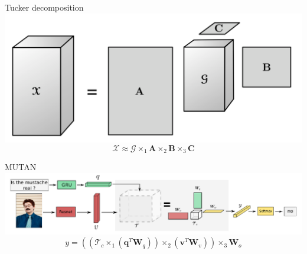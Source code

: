 \documentclass{beamer}
\begin{document}
{%
\begin{frame}{Tucker decomposition}
        \center{}
        \includegraphics[scale=0.28]{data/tucker_decomp}
        \begin{equation*}
                \mathcal{X} \approx \mathcal{G} \times_1 \mathbf{A} \times_2 \mathbf{B} \times_3 \mathbf{C}
        \end{equation*}
\end{frame}
}

{%
\begin{frame}{MUTAN}
        \center{}
        \hspace*{-1.0cm}
        \includegraphics[scale=0.31]{data/mutan}
        \begin{equation*}
                y = \left(\left(\mathcal{T}_c \times_1 \left(\mathbf{q}^T\mathbf{W}_q\right)\right)
                        \times_2 \left(\mathbf{v}^T\mathbf{W}_v\right)\right)
                    \times_3 \mathbf{W}_o
        \end{equation*}
\end{frame}
}
\end{document}
